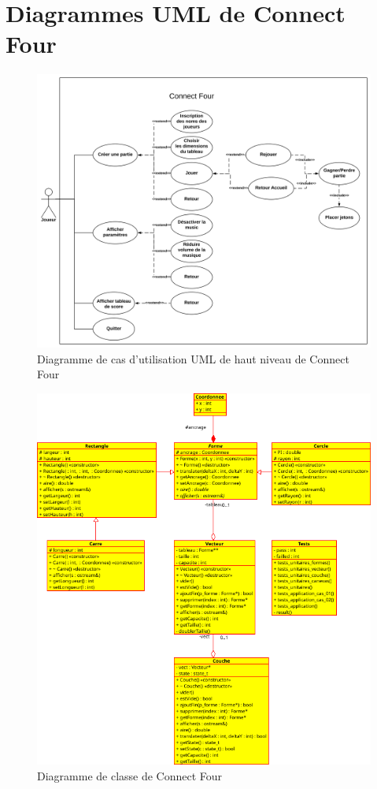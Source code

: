 \section{Diagrammes UML de Connect Four}


\begin{figure}[H]
    \centering
    \includegraphics[width=6in]{img/cas}
    \caption{Diagramme de cas d’utilisation UML de haut niveau de Connect Four}
\end{figure}

\begin{figure}[H]
    \centering
    \includegraphics[width=6in]{img/classes}
    \caption{Diagramme de classe de Connect Four}
\end{figure}

